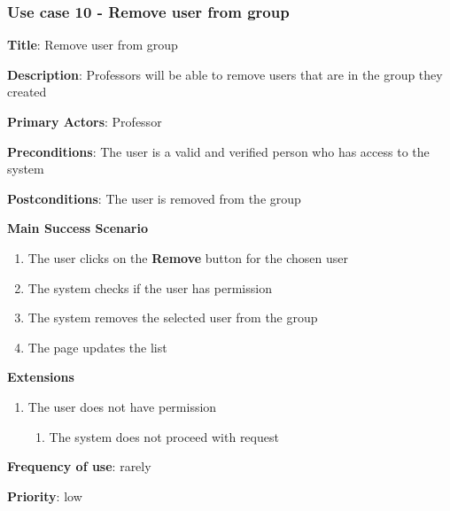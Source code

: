 \documentclass[singlespacing,12pt,parskip,headsepline,consistentlayout]{article}
\begin{document}
\subsubsection{Use case 10 - Remove user from group}
\begin{flushleft}
\vspace{0.2cm}
\hline
\vspace{0.2cm}
{\bfseries Title}: {Remove user from group}

{\bfseries Description}: {Professors will be able to remove users that are in the group they created}

{\bfseries Primary Actors}: {Professor}

{\bfseries Preconditions}: The user is a valid and verified person who has access to the system

{\bfseries Postconditions}: {The user is removed from the group}

{\bfseries Main Success Scenario}

\begin{enumerate}
      \item The user clicks on the {\bfseries Remove} button for the chosen user
      \item The system checks if the user has permission
      \item The system removes the selected user from the group
      \item The page updates the list
\end{enumerate}
 
{\bfseries Extensions}

\begin{enumerate}
  \item The user does not have permission
  \begin{enumerate}
      \item The system does not proceed with request
  \end{enumerate}
\end{enumerate}

{\bfseries Frequency of use}: rarely

{\bfseries Priority}: low

\end{flushleft}

\pagebreak
\end{document}
